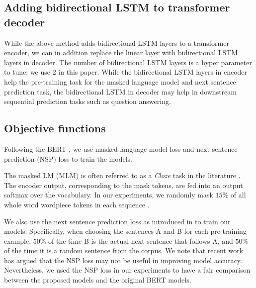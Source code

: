 \documentclass[11pt,a4paper]{article}
\begin{document}
\subsection{Adding bidirectional LSTM to transformer decoder}
While the above method adds bidirectional LSTM layers to a transformer encoder, we can in addition replace the linear layer with bidirectional LSTM layers in decoder.  The number of bidirectional LSTM layers is a hyper parameter to tune; we use 2 in this paper. While the bidirectional LSTM layers in encoder help the pre-training task for the masked language model and next sentence prediction task, the bidirectional LSTM in decoder may help in downstream sequential prediction tasks such as question answering. 

\subsection{Objective functions}
Following the BERT \cite{devlin2018}, we use masked language model loss and next sentence prediction (NSP) loss to train the models.

The masked LM (MLM) is often referred to as a \textit{Cloze} task in the literature \cite{taylor1953}. The encoder output, corresponding to the mask tokens, are fed into an output softmax over the vocabulary. In our experiments, we randomly mask $15\%$ of all whole word wordpiece tokens in each sequence \cite{wu2016}.

We also use the next sentence prediction loss as introduced in \cite{devlin2018} to train our models.  Specifically,
when choosing the sentences A and B for each pre-training example, $50\%$ of the time B is the actual next sentence that follows A, and $50\%$ of the time it is a random sentence from the corpus. We note that recent work \cite{yang2019,liu2019,lan2019,raffel2019} has argued that the NSP loss may not be useful in improving model accuracy. Nevertheless, we used the NSP loss in our experiments to have a fair comparison between the proposed models and the original BERT models.
\end{document}
